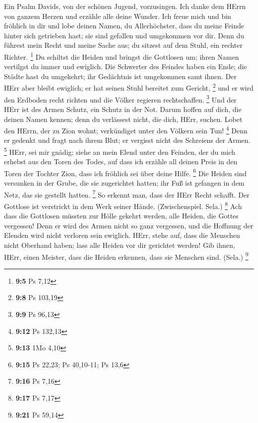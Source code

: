  Ein Psalm Davids, von der schönen Jugend, vorzusingen.
 Ich danke dem HErrn von ganzem Herzen und erzähle alle
deine Wunder.  Ich freue mich und bin fröhlich in dir und
lobe deinen Namen, du Allerhöchster,  dass du meine Feinde
hinter sich getrieben hast; sie sind gefallen und umgekommen vor dir.
 Denn du führest mein Recht und meine Sache aus; du
sitzest auf dem Stuhl, ein rechter Richter. \footnote{\textbf{9:5} Ps
  7,12}  Du schiltst die Heiden und bringst die Gottlosen
um; ihren Namen vertilgst du immer und ewiglich.  Die
Schwerter des Feindes haben ein Ende; die Städte hast du umgekehrt; ihr
Gedächtnis ist umgekommen samt ihnen.  Der HErr aber
bleibt ewiglich; er hat seinen Stuhl bereitet zum Gericht, \footnote{\textbf{9:8}
  Ps 103,19}  und er wird den Erdboden recht richten und
die Völker regieren rechtschaffen. \footnote{\textbf{9:9} Ps 96,13}
 Und der HErr ist des Armen Schutz, ein Schutz in der
Not.  Darum hoffen auf dich, die deinen Namen kennen;
denn du verlässest nicht, die dich, HErr, suchen.  Lobet
den HErrn, der zu Zion wohnt; verkündiget unter den Völkern sein Tun!
\footnote{\textbf{9:12} Ps 132,13}  Denn er gedenkt und
fragt nach ihrem Blut; er vergisst nicht des Schreiens der Armen.
\footnote{\textbf{9:13} 1Mo 4,10}  HErr, sei mir gnädig;
siehe an mein Elend unter den Feinden, der du mich erhebst aus den Toren
des Todes,  auf dass ich erzähle all deinen Preis in den
Toren der Tochter Zion, dass ich fröhlich sei über deine Hilfe.
\footnote{\textbf{9:15} Ps 22,23; Ps 40,10-11; Ps 13,6} 
Die Heiden sind versunken in der Grube, die sie zugerichtet hatten; ihr
Fuß ist gefangen in dem Netz, das sie gestellt hatten. \footnote{\textbf{9:16}
  Ps 7,16}  So erkennt man, dass der HErr Recht schafft.
Der Gottlose ist verstrickt in dem Werk seiner Hände. (Zwischenspiel.
Sela.) \footnote{\textbf{9:17} Ps 7,17}  Ach dass die
Gottlosen müssten zur Hölle gekehrt werden, alle Heiden, die Gottes
vergessen!  Denn er wird des Armen nicht so ganz
vergessen, und die Hoffnung der Elenden wird nicht verloren sein
ewiglich.  HErr, stehe auf, dass die Menschen nicht
Oberhand haben; lass alle Heiden vor dir gerichtet werden!
 Gib ihnen, HErr, einen Meister, dass die Heiden
erkennen, dass sie Menschen sind. (Sela.) \footnote{\textbf{9:21} Ps
  59,14}

